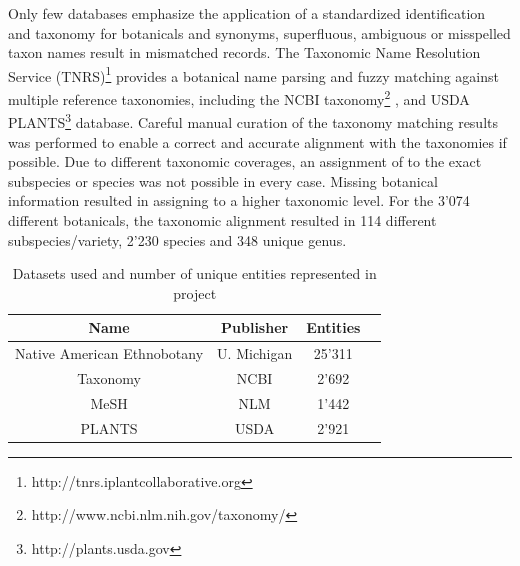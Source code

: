 \documentclass{acm_proc_article-sp}
\newcommand{\head}[1]{\textnormal{\textbf{#1}}}
\begin{document}
Only few databases emphasize the application of a standardized identification and taxonomy for botanicals and synonyms, superfluous, ambiguous or misspelled taxon names result in mismatched records. The Taxonomic Name Resolution Service (TNRS)\footnote{http://tnrs.iplantcollaborative.org} \cite{Pubmed:23324024} provides a botanical name parsing and fuzzy matching against multiple reference taxonomies, including the NCBI taxonomy\footnote{http://www.ncbi.nlm.nih.gov/taxonomy/}
\cite{Sayers:NCBITax1},\cite{Benson:NCBITax2} and USDA PLANTS\footnote{http://plants.usda.gov} database. Careful manual curation of the taxonomy matching results was performed to enable a correct and accurate alignment with the taxonomies if possible. Due to different taxonomic coverages, an assignment of to the exact subspecies or species was not possible in every case. Missing botanical information resulted in assigning to a higher taxonomic level. For the 3'074 different botanicals, the taxonomic alignment resulted in 114 different subspecies/variety, 2'230 species and 348 unique genus.


\begin{table}
	\centering
	\caption{Datasets used and number of unique entities represented in project}
	\begin{tabular}{|c|c|c|c|}
		\toprule[1.5pt]
		\head{Name} & \head{Publisher} & \head{Entities}\\
		\midrule
		Native American Ethnobotany & U. Michigan & 25'311 \\
		Taxonomy & NCBI & 2'692 \\ 
		MeSH & NLM & 1'442 \\
		PLANTS & USDA & 2'921 \\ 
		\bottomrule[1.5pt]
		\end{tabular}
\end{table}
\end{document}
